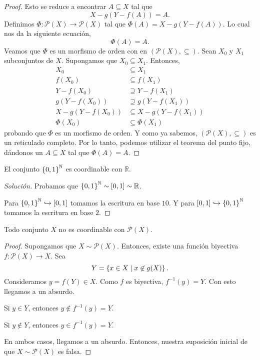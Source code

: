 \begin{proof}
    Esto se reduce a encontrar $A \subseteq X$ tal que
    $$
        X - g(Y - f(A)) = A.
    $$
    Definimos $\Phi : \mathcal{P}(X) \to  \mathcal{P}(X)$ tal que $\Phi(A) = X - g(Y - f(A))$. Lo cual nos da la siguiente ecuación,
    $$
        \Phi (A) = A.
    $$
    Veamos que $\Phi$ es un morfismo de orden con en $(\mathcal{P}(X), \subseteq )$. Sean $X_{0}$ y $X_{1}$ subconjuntos de $X$. Supongamos que $X_{0} \subseteq X_{1}$. Entonces,
    \begin{align*}
        X_{0} &\subseteq X_{1} \\
        f(X_{0}) &\subseteq f(X_{1}) \\
        Y - f(X_{0}) &\supseteq Y - f(X_{1}) \\
        g(Y - f(X_{0})) &\supseteq g(Y - f(X_{1})) \\
        X - g(Y - f(X_{0})) &\subseteq X - g(Y - f(X_{1})) \\
        \Phi(X_{0}) & \subseteq \Phi(X_{1})
    \end{align*}
    probando que $\Phi$ es un morfismo de orden. Y como ya sabemos, $(\mathcal{P}(X), \subseteq)$ es un reticulado completo. Por lo tanto, podemos utilizar el teorema del punto fijo, dándonos un $A \subseteq X$ tal que $\Phi (A) = A$.
\end{proof}

\begin{example}
    El conjunto $\left\{  0, 1  \right\}^{\mathbb{N}}$ es coordinable con $\mathbb{R}$.
\end{example}

\begin{proof}[Solución]
    Probamos que $\left\{  0, 1  \right\}^{\mathbb{N}} \sim [0, 1] \sim \mathbb{R}$. 
    
    Para $\left\{  0, 1  \right\}^{\mathbb{N}} \hookrightarrow [0, 1]$ tomamos la escritura en base $10$. Y para $[0, 1] \hookrightarrow \left\{  0, 1  \right\}^{\mathbb{N}}$ tomamos la escritura en base $2$.
\end{proof}

\begin{theorem}
    Todo conjunto $X$ no es coordinable con $\mathcal{P}(X)$.
\end{theorem}

\begin{proof}
    Supongamos que $X \sim \mathcal{P}(X)$. Entonces, existe una función biyectiva $f: \mathcal{P}(X) \to X$. Sea 
    $$
        Y = \left\{  x \in X \mid x \not \in g(X) \right\}.
    $$
    Consideramos $y = f(Y) \in X$. Como $f$ es biyectiva, $f^{-1}(y) = Y$. Con esto llegamos a un absurdo.
    \begin{center}
        Si $y \in Y$, entonces $y \not \in f^{-1}(y) = Y$.

        Si $y \not \in Y$, entonces $y \in f^{-1}(y) = Y$.
    \end{center}
    En ambos casos, llegamos a un absurdo. Entonces, nuestra suposición inicial de que $X \sim \mathcal{P}(X)$ es falsa.
\end{proof}

